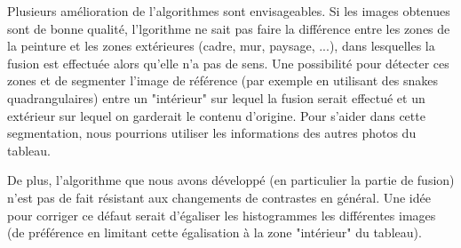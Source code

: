 \documentclass[12pt,a4paper]{article}
\begin{document}
Plusieurs amélioration de l'algorithmes sont envisageables. Si les images obtenues sont de bonne qualité, l'lgorithme ne sait pas faire la différence entre les zones de la peinture et les zones extérieures (cadre, mur, paysage, ...), dans lesquelles la fusion est effectuée alors qu'elle n'a pas de sens. Une possibilité pour détecter ces zones et de segmenter l'image de référence (par exemple en utilisant des snakes quadrangulaires) entre un "intérieur" sur lequel la fusion serait effectué et un extérieur sur lequel on garderait le contenu d'origine. Pour s'aider dans cette segmentation, nous pourrions utiliser les informations des autres photos du tableau.

De plus, l'algorithme que nous avons développé (en particulier la partie de fusion) n'est pas de fait résistant aux changements de contrastes en général. Une idée pour corriger ce défaut serait d'égaliser les histogrammes les différentes images (de préférence en limitant cette égalisation à la zone "intérieur" du tableau).
\end{document}
